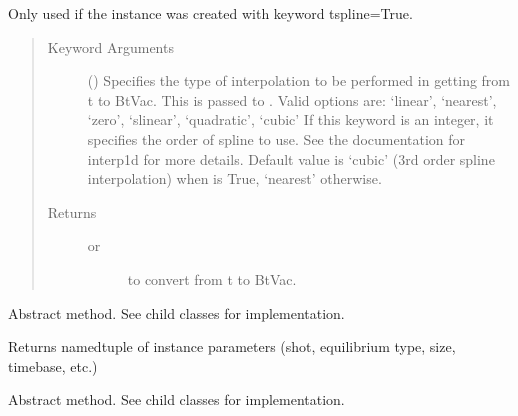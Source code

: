 \documentclass[letterpaper,10pt,english]{sphinxmanual}
\begin{document}
\begin{fulllineitems}
\begin{fulllineitems}
Only used if the instance was created with keyword tspline=True.
\begin{quote}\begin{description}
\item[{Keyword Arguments}] \leavevmode
{} () \textendash{} Specifies the type of interpolation to be performed in getting
from t to BtVac. This is passed to
. Valid options are:
‘linear’, ‘nearest’, ‘zero’, ‘slinear’, ‘quadratic’, ‘cubic’
If this keyword is an integer, it specifies the order of spline
to use. See the documentation for interp1d for more details.
Default value is ‘cubic’ (3rd order spline interpolation) when
 is True, ‘nearest’ otherwise.

\item[{Returns}] \leavevmode
\begin{description}
\item[{ or}] \leavevmode
{} to convert from t to BtVac.

\end{description}


\end{description}\end{quote}

\end{fulllineitems}


\begin{fulllineitems}
\label{\detokenize{eqtools:eqtools.core.Equilibrium.getInfo}}
Abstract method.  See child classes for implementation.

Returns namedtuple of instance parameters (shot, equilibrium type, size, timebase, etc.)

\end{fulllineitems}


\begin{fulllineitems}
\label{\detokenize{eqtools:eqtools.core.Equilibrium.getTimeBase}}
Abstract method.  See child classes for implementation.


\end{fulllineitems}
\end{fulllineitems}
\end{document}
